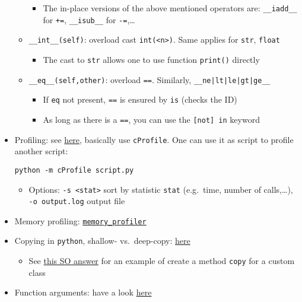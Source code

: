 \documentclass[a4paper,12pt,%
              final%
              ]{article}
\begin{document}
\begin{itemize}
\begin{itemize}
\begin{itemize}
          \item The in-place versions of the above mentioned operators are: \verb|__iadd__| for \verb|+=|, \verb|__isub__| for \verb|-=|,\ldots
        \end{itemize}
      \item \verb|__int__(self)|: overload cast \verb|int(<n>)|. Same applies for \verb|str|, \verb|float|
        \begin{itemize}
          \item The cast to \verb|str| allows one to use function \verb|print()| directly
        \end{itemize}
      \item \verb|__eq__(self,other)|: overload \verb|==|. Similarly, \verb!__ne|lt|le|gt|ge__!
        \begin{itemize}
          \item If \texttt{eq} not present, \texttt{==} is ensured by \texttt{is} (checks the ID)
          \item As long as there is a \texttt{==}, you can use the \verb|[not] in| keyword
        \end{itemize}
    \end{itemize}
  \item Profiling: see \href{https://docs.python.org/3/library/profile.html}{here}, basically use \texttt{cProfile}. One can use it as script to profile another script:
\begin{verbatim}
python -m cProfile script.py
\end{verbatim}
    \begin{itemize}
      \item Options: \verb|-s <stat>| sort by statistic \texttt{stat} (e.g.\ time, number of calls,\ldots), \verb|-o output.log| output file
    \end{itemize}
  \item Memory profiling: \href{https://github.com/pythonprofilers/memory_profiler}{\texttt{memory\_profiler}}
  \item Copying in \texttt{python}, shallow- vs.\ deep-copy: \href{https://www.programiz.com/python-programming/shallow-deep-copy}{here}
    \begin{itemize}
      \item See \href{https://stackoverflow.com/a/46939443}{this SO answer} for an example of create a method \texttt{copy} for a custom class
    \end{itemize}
  \item Function arguments: have a look \href{https://www.python-course.eu/python3_passing_arguments.php}{here}

\end{itemize}
\end{document}
